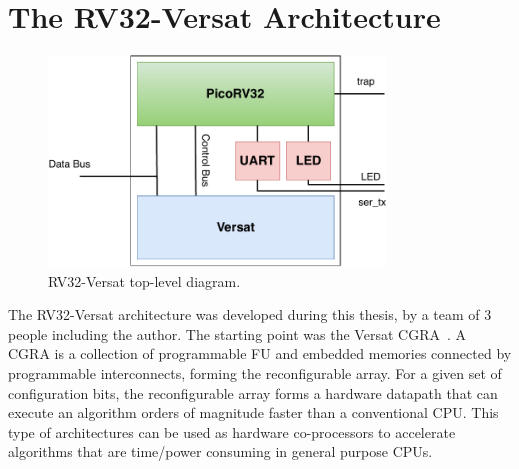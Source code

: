 
\chapter{The RV32-Versat Architecture}
\label{chapter:rv32-versat}


\begin{figure}[!htb]
	\centering
	\includegraphics[width=0.8\textwidth]{Figures/rv32-versat.pdf}
	\caption{RV32-Versat top-level diagram.}
	\label{fig:rv32-versat}
\end{figure}

The RV32-Versat architecture was developed during this thesis, by a team of 3
people including the author. The starting point was the Versat
\ac{CGRA}~\cite{sousa:versat, sousa:versat2016, sousa:controller,
sousa:compiler, versat:specification}. A \acf{CGRA} is a collection of programmable 
\ac{FU} and embedded memories connected by programmable interconnects, forming the 
reconfigurable array. For a given set of configuration bits, the reconfigurable
array forms a hardware datapath that can execute an algorithm orders of magnitude faster 
than a conventional \ac{CPU}. This type of architectures can be used as hardware 
co-processors to accelerate algorithms that are time/power consuming in general purpose 
\ac{CPU}s.

